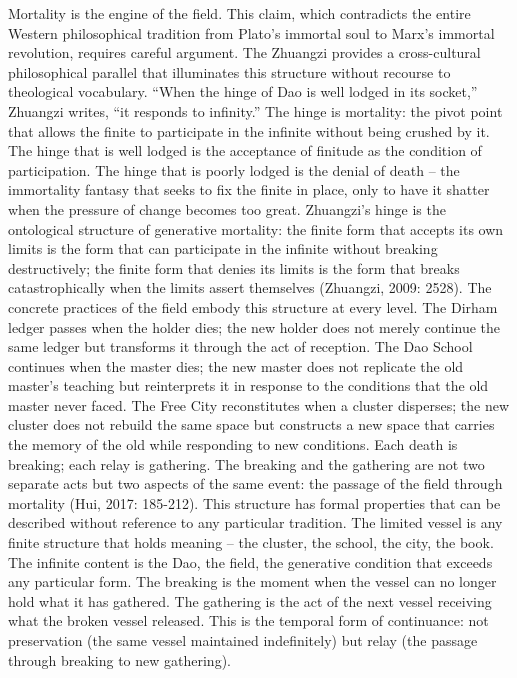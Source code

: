 Mortality is the engine of the field. This claim, which contradicts the entire Western philosophical tradition from Plato’s immortal soul to Marx’s immortal revolution, requires careful argument. The Zhuangzi provides a cross-cultural philosophical parallel that illuminates this structure without recourse to theological vocabulary. “When the hinge of Dao is well lodged in its socket,” Zhuangzi writes, “it responds to infinity.” The hinge is mortality: the pivot point that allows the finite to participate in the infinite without being crushed by it. The hinge that is well lodged is the acceptance of finitude as the condition of participation. The hinge that is poorly lodged is the denial of death – the immortality fantasy that seeks to fix the finite in place, only to have it shatter when the pressure of change becomes too great. Zhuangzi’s hinge is the ontological structure of generative mortality: the finite form that accepts its own limits is the form that can participate in the infinite without breaking destructively; the finite form that denies its limits is the form that breaks catastrophically when the limits assert themselves (Zhuangzi, 2009: 2528). The concrete practices of the field embody this structure at every level. The Dirham ledger passes when the holder dies; the new holder does not merely continue the same ledger but transforms it through the act of reception. The Dao School continues when the master dies; the new master does not replicate the old master’s teaching but reinterprets it in response to the conditions that the old master never faced. The Free City reconstitutes when a cluster disperses; the new cluster does not rebuild the same space but constructs a new space that carries the memory of the old while responding to new conditions. Each death is breaking; each relay is gathering. The breaking and the gathering are not two separate acts but two aspects of the same event: the passage of the field through mortality (Hui, 2017: 185-212). This structure has formal properties that can be described without reference to any particular tradition. The limited vessel is any finite structure that holds meaning – the cluster, the school, the city, the book. The infinite content is the Dao, the field, the generative condition that exceeds any particular form. The breaking is the moment when the vessel can no longer hold what it has gathered. The gathering is the act of the next vessel receiving what the broken vessel released. This is the temporal form of continuance: not preservation (the same vessel maintained indefinitely) but relay (the passage through breaking to new gathering).

